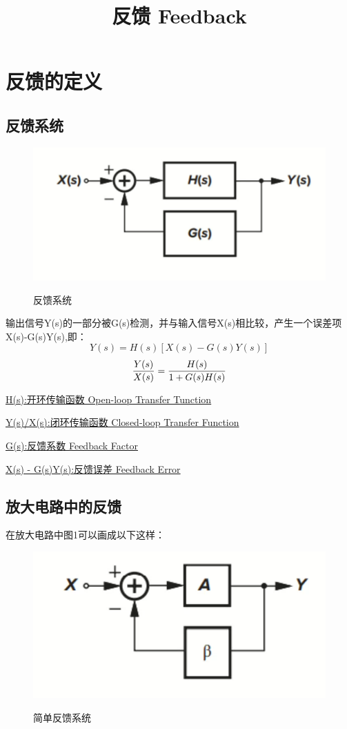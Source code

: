 \documentclass[]{ctexart}
\title{反馈 Feedback}
\begin{document}
\section{反馈的定义}
\subsection{反馈系统}
    \begin{figure}[ht]
        \centering
        \includegraphics[width=0.75\columnwidth]{Feedback_System}
        \label{图1}
        \caption{反馈系统}
    \end{figure}

    输出信号Y(s)的一部分被G(s)检测，并与输入信号X(s)相比较，产生一个误差项X(s)-G(s)Y(s),即：
    \begin{equation}
        Y(s)=H(s)[X(s)-G(s)Y(s)]
    \end{equation}
    \begin{equation}
        {Y(s) \over X(s)}={H(s) \over 1+G(s)H(s)}
    \end{equation}

    \underline{H(s):开环传输函数 Open-loop Transfer Tunction}

    \underline{Y(s)/X(s):闭环传输函数 Closed-loop Transfer Function}

    \underline{G(s):反馈系数 Feedback Factor}

    \underline{X(s) - G(s)Y(s):反馈误差 Feedback Error}

\subsection{放大电路中的反馈}
    在放大电路中图1可以画成以下这样：

    \begin{figure}[ht]
        \centering
        \includegraphics[scale=0.19]{Simple_Feedback_System}
        \label{图2}
        \caption{简单反馈系统}
    \end{figure}
\end{document}
